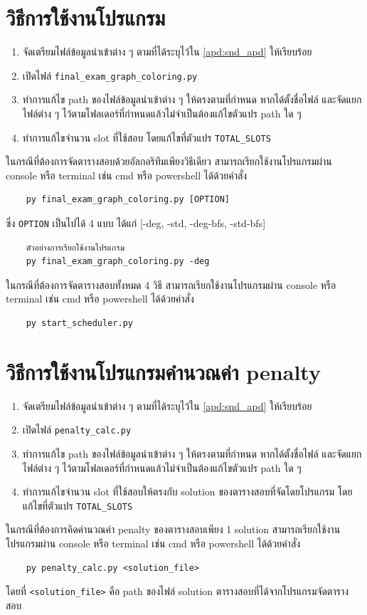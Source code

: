 \section{วิธีการใช้งานโปรแกรม}
\begin{enumerate}
    \item จัดเตรียมไฟล์ข้อมูลนำเข้าต่าง ๆ ตามที่ได้ระบุไว้ใน \ref{apd:snd_apd} ให้เรียบร้อย
    \item เปิดไฟล์ \verb+final_exam_graph_coloring.py+
    \item ทำการแก้ไข path ของไฟล์ข้อมูลนำเข้าต่าง ๆ ให้ตรงตามที่กำหนด หากได้ตั้งชื่อไฟล์ และจัดแยกไฟล์ต่าง ๆ ไว้ตามโฟลเดอร์ที่กำหนดแล้วไม่จำเป็นต้องแก้ไขตัวแปร path ใด ๆ
    \item ทำการแก้ไขจำนวน slot ที่ใช้สอบ โดยแก้ไขที่ตัวแปร \verb+TOTAL_SLOTS+
\end{enumerate}
ในกรณีที่ต้องการจัดตารางสอบด้วยอัลกอริทึมเพียงวิธีเดียว สามารถเรียกใช้งานโปรแกรมผ่าน console หรือ terminal เช่น cmd หรือ powershell ได้ด้วยคำสั่ง 
\begin{verbatim}
    py final_exam_graph_coloring.py [OPTION]
\end{verbatim}
ซึ่ง \verb+OPTION+ เป็นไปได้ 4 แบบ ได้แก่ [-deg, -std, -deg-bfs, -std-bfs]

\begin{verbatim}
    ตัวอย่างการเรียกใช้งานโปรแกรม
    py final_exam_graph_coloring.py -deg
\end{verbatim}

\noindent ในกรณีที่ต้องการจัดตารางสอบทั้งหมด 4 วิธี สามารถเรียกใช้งานโปรแกรมผ่าน console หรือ terminal เช่น cmd หรือ powershell ได้ด้วยคำสั่ง
\begin{verbatim}
    py start_scheduler.py
\end{verbatim}
\section{วิธีการใช้งานโปรแกรมคำนวณค่า penalty}
\begin{enumerate}
    \item จัดเตรียมไฟล์ข้อมูลนำเข้าต่าง ๆ ตามที่ได้ระบุไว้ใน \ref{apd:snd_apd} ให้เรียบร้อย
    \item เปิดไฟล์ \verb+penalty_calc.py+
    \item ทำการแก้ไข path ของไฟล์ข้อมูลนำเข้าต่าง ๆ ให้ตรงตามที่กำหนด หากได้ตั้งชื่อไฟล์ และจัดแยกไฟล์ต่าง ๆ ไว้ตามโฟลเดอร์ที่กำหนดแล้วไม่จำเป็นต้องแก้ไขตัวแปร path ใด ๆ
    \item ทำการแก้ไขจำนวน slot ที่ใช้สอบให้ตรงกับ solution ของตารางสอบที่จัดโดยโปรแกรม โดยแก้ไขที่ตัวแปร \verb+TOTAL_SLOTS+
\end{enumerate}
ในกรณีที่ต้องการคิดคำนวณค่า penalty ของตารางสอบเพียง 1 solution สามารถเรียกใช้งานโปรแกรมผ่าน console หรือ terminal เช่น cmd หรือ powershell ได้ด้วยคำสั่ง 
\begin{verbatim}
    py penalty_calc.py <solution_file>
\end{verbatim}
โดยที่ \verb+<solution_file>+ คือ path ของไฟล์ solution ตารางสอบที่ได้จากโปรแกรมจัดตารางสอบ

